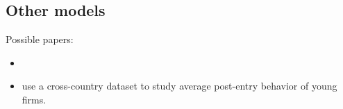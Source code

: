 \documentclass{article}
\begin{document}
\subsection{Other models}

Possible papers:
\begin{itemize}
\item %
\item \textcite{NBERc0480} use a cross-country dataset to study average post-entry behavior of young firms. 
\end{itemize}

%
%

\printbibliography
\end{document}
